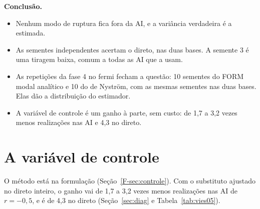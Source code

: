 \documentclass[11pt,a4paper]{article}
\begin{document}
\textbf{Conclusão.}
\begin{itemize}
  \item Nenhum modo de ruptura fica fora da AI, e a variância verdadeira é a estimada.
  \item As sementes independentes acertam o direto, nas duas bases. A semente 3 é uma tiragem baixa, comum a todas as
    AI que a usam.
  \item As repetições da fase 4 no fermi fecham a questão: 10 sementes do FORM modal analítico e 10 do de Nyström, com as
    mesmas sementes nas duas bases. Elas dão a distribuição do estimador.
  \item A variável de controle é um ganho à parte, sem custo: de 1{,}7 a 3{,}2 vezes menos realizações nas AI e 4{,}3 no direto.
\end{itemize}

\section{A variável de controle}\label{sec:cv}
O método está na formulação (Seção~\ref{F-sec:controle}). Com o substituto ajustado no direto inteiro, o ganho vai de
1{,}7 a 3{,}2 vezes menos realizações nas AI de $r = -0{,}5$, e é de
4{,}3 no direto (Seção~\ref{sec:diag} e Tabela~\ref{tab:vies05}).
\end{document}
